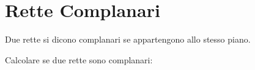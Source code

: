 \section{Rette Complanari}
\begin{definizione}
  Due rette si dicono complanari se appartengono allo stesso piano.
\end{definizione}
	
\begin{osservazione}
  Calcolare se due rette sono complanari:
\end{osservazione}

